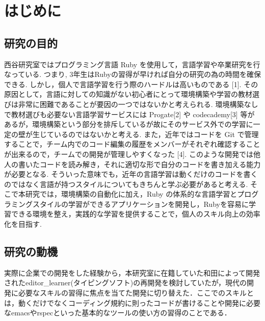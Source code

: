 \chapter{はじめに}\label{ux306fux3058ux3081ux306b}

    \section{研究の目的}\label{ux7814ux7a76ux306eux76eeux7684}

    西谷研究室ではプログラミング言語 Ruby を使用して，言語学習や卒業研究を行なっている. つまり, 3年生はRubyの習得が早ければ自分の研究の為の時間を確保できる. しかし，個人で言語学習を行う際のハードルは高いものである [1]. その原因として，言語に対しての知識がない初心者にとって環境構築や学習の教材選びは非常に困難であることが要因の一つではないかと考えられる. 環境構築なしで教材選びも必要ない言語学習サービスには Progate[2] や codecademy[3] 等があるが，環境構築という部分を排斥しているが故にそのサービス外での学習に一定の壁が生じているのではないかと考える.
また，近年ではコードを Git で管理することで，チーム内でのコード編集の履歴をメンバーがそれぞれ確認することが出来るので，チームでの開発が管理しやすくなった [4]. このような開発では他人の書いたコードを読み解き，それに適切な形で自分のコードを書き加える能力が必要となる. そういった意味でも，近年の言語学習は動くだけのコードを書くのではなく言語が持つスタイルについてもきちんと学ぶ必要があると考える.
そこで本研究では，環境構築の自動化に加え，Ruby の体系的な言語学習とプログラミングスタイルの学習ができるアプリケーションを開発し，Rubyを容易に学習できる環境を整え，実践的な学習を提供することで，個人のスキル向上の効率化を目指す.


    \section{研究の動機}\label{ux7814ux7a76ux306eux52d5ux6a5f}

    実際に企業での開発をした経験から，本研究室に在籍していた和田によって開発されたeditor\_learner(タイピングソフト)の再開発を検討していたが，現代の開発に必要なスキルの習得に焦点を当てた開発に切り替えた．ここでのスキルとは，動くだけでなくコーディング規約に則ったコードが書けることや開発に必要なemacsやrspecといった基本的なツールの使い方の習得のことである．

    
